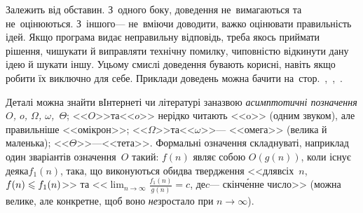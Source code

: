 \label{text:need-or-no-need-to-prove}
Залежить від обставин. З~одного боку, доведення не~вимагаються та не~оцінюються. З~іншого\nolinebreak[3] --- не~вміючи доводити, важко оцінювати правильність ідей. Якщо програма видає неправильну відповідь, треба якось приймати рішення, чи\nolinebreak[3] шукати й виправляти технічну помилку, чи\nolinebreak[3] повністю відкинути дану ідею й шукати іншу. У\nolinebreak[3] цьому смислі доведення бувають  корисні, навіть якщо робити їх виключно для себе. Приклади доведень можна бачити на~стор.~\pageref{text:proof-example-parket-1},~\pageref{text:proof-example-train-to-ship},~\pageref{text:proof-max-num-by-strike-out-one-digit}.



\renewcommand{\floatpagefraction}{0.625}

 Деталі можна знайти в\nolinebreak[3] Інтернеті чи літературі за\nolinebreak[1] назвою \emph{асимптотичні позначення $O$, $o$, $\Omega$, $\omega$,~$\Theta$}; <<$O$>>\nolinebreak[2] та\nolinebreak[2] <<$o$>> нерідко читають <<o>> (одним звуком), але правильніше <<омікрон>>; <<$\Omega$>>\nolinebreak[2] та\nolinebreak[2] <<$\omega$>>\nolinebreak[3] --- <<омега>> (велика й маленька); <<$\Theta$>>\nolinebreak[3] ---\nolinebreak[2] <<тета>>. Формальні означення складнуваті, наприклад один з\nolinebreak[3] варіантів означення~$O$ такий: $f(n)$ являє собою $O(g(n))$, коли існує \mbox{деяка}\nolinebreak[3] $f_1(n)$, така, що виконуються обидва твердження <<для\nolinebreak[1] всіх~$n$, $f(n)\leqslant f_1(n)$>> та <<$\displaystyle\lim_{n\to\infty}\frac{f_1(n)}{g(n)}=c$, де\nolinebreak[2] $c$\nolinebreak[3] --- скінч\'{е}нне число>> (можна велике, але конкретне, щоб воно \emph{не}\nolinebreak[3] зростало при ${n\to\infty}$).

